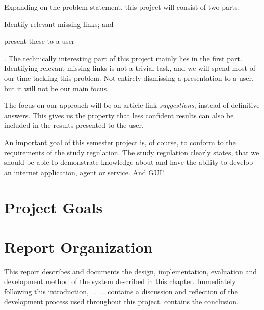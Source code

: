 Expanding on the problem statement, this project will consist of two parts:
\begin{enumerate*}[label=(\roman*)]
  \item Identify relevant missing links; and
  \item present these to a user
\end{enumerate*}.
The technically interesting part of this project mainly lies in the first part. Identifying relevant missing links is not a trivial task, and we will spend most of our time tackling this problem. Not entirely dismissing a presentation to a user, but it will not be our main focus.

The focus on our approach will be on article link \emph{suggestions}, instead of definitive answers. This gives us the property that less confident results can also be included in the results presented to the user.

An important goal of this semester project is, of course, to conform to the requirements of the study regulation. The study regulation clearly states, that we should be able to demonstrate knowledge about and have the ability to develop an internet application, agent or service. And GUI! 


\section{Project Goals}

\section{Report Organization}
This report describes and documents the design, implementation, evaluation and development method of the system described in this chapter. Immediately following this introduction,  ... \dummy ...  contains a discussion and reflection of the development process used throughout this project.  contains the conclusion.
